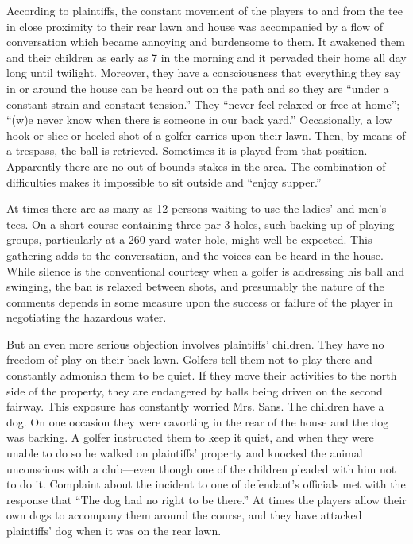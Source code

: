 According to plaintiffs, the constant movement of the players to and from the
tee in close proximity to their rear lawn and house was accompanied by a flow of
conversation which became annoying and burdensome to them. It awakened them and
their children as early as 7 in the morning and it pervaded their home all day
long until twilight. Moreover, they have a consciousness that everything they
say in or around the house can be heard out on the path and so they are ``under
a constant strain and constant tension.'' They ``never feel relaxed or free at
home''; ``(w)e never know when there is someone in our back yard.''
Occasionally, a
low hook or slice or heeled shot of a golfer carries upon their lawn. Then, by
means of a trespass, the ball is retrieved. Sometimes it is played from that
position. Apparently there are no out-of-bounds stakes in the area. The
combination of difficulties makes it impossible to sit outside and ``enjoy
supper.''

At times there are as many as 12 persons waiting to use the ladies' and men's
tees. On a short course containing three par 3 holes, such backing up of playing
groups, particularly at a 260-yard water hole, might well be expected. This
gathering adds to the conversation, and the voices can be heard in the house.
While silence is the conventional courtesy when a golfer is addressing his ball
and swinging, the ban is relaxed between shots, and presumably the nature of the
comments depends in some measure upon the success or failure of the player in
negotiating the hazardous water.

But an even more serious objection involves plaintiffs' children. They have no
freedom of play on their back lawn. Golfers tell them not to play there and
constantly admonish them to be quiet. If they move their activities to the north
side of the property, they are endangered by balls being driven on the second
fairway. This exposure has constantly worried Mrs. Sans. The children have a
dog. On one occasion they were cavorting in the rear of the house and the dog
was barking. A golfer instructed them to keep it quiet, and when they were
unable to do so he walked on plaintiffs' property and knocked the animal
unconscious with a club---even though one of the children pleaded with him not
to
do it. Complaint about the incident to one of defendant's officials met with the
response that ``The dog had no right to be there.'' At times the players allow
their own dogs to accompany them around the course, and they have attacked
plaintiffs' dog when it was on the rear lawn.

